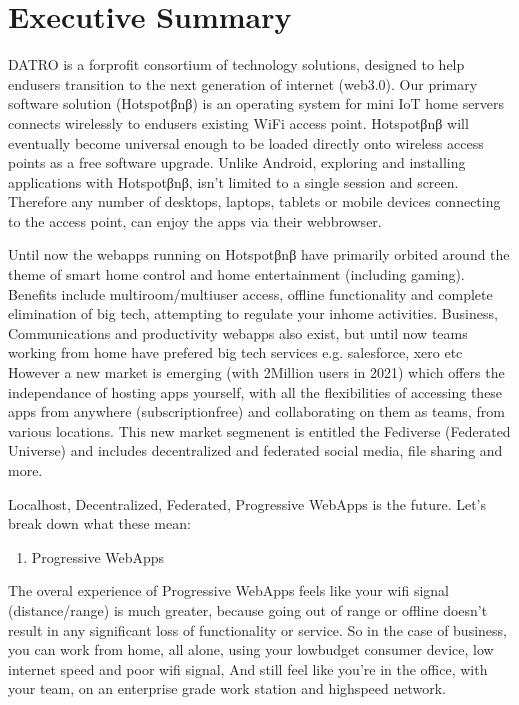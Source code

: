 \documentclass[letterpaper,10pt,openany,oneside,english]{sphinxmanual}
\begin{document}
\chapter{Executive Summary}
\label{\detokenize{executivesummary:executive-summary}}\label{\detokenize{executivesummary::doc}}
\sphinxAtStartPar
DATRO is a for\sphinxhyphen{}profit consortium of technology solutions, designed to help end\sphinxhyphen{}users transition to the next generation of internet (web3.0).
Our primary software solution (Hotspotβnβ) is an operating system for mini IoT home servers connects wirelessly to end\sphinxhyphen{}users existing Wi\sphinxhyphen{}Fi access point.
Hotspotβnβ will eventually become universal enough to be loaded directly onto wireless access points as a free software upgrade.
Unlike Android, exploring and installing applications with Hotspotβnβ, isn’t limited to a single session and screen.
Therefore any number of desktops, laptops, tablets or mobile devices connecting to the access point, can enjoy the apps via their web\sphinxhyphen{}browser.

\sphinxAtStartPar
Until now the webapps running on Hotspotβnβ have primarily orbited around the theme of smart home control and home entertainment (including gaming).
Benefits include multi\sphinxhyphen{}room/multi\sphinxhyphen{}user access, offline functionality and complete elimination of big tech, attempting to regulate your in\sphinxhyphen{}home activities.
Business, Communications and productivity webapps also exist, but until now teams working from home have prefered big tech services e.g. salesforce, xero etc
However a new market is emerging (with 2Million users in 2021) which offers the independance of hosting apps yourself,
with all the flexibilities of accessing these apps from anywhere (subscription\sphinxhyphen{}free) and collaborating on them as teams, from various locations.
This new market segmenent is entitled the Fediverse (Federated Universe) and includes decentralized and federated social media, file sharing and more.

\sphinxAtStartPar
Localhost, Decentralized, Federated, Progressive WebApps is the future. Let’s break down what these mean:
\begin{enumerate}
%
\item {} 
\sphinxAtStartPar
Progressive WebApps

\end{enumerate}

\sphinxAtStartPar
The overal experience of Progressive WebApps feels like your wi\sphinxhyphen{}fi signal (distance/range) is much greater, because going out of range or offline doesn’t result in any significant loss of functionality or service.
So in the case of business, you can work from home, all alone, using your low\sphinxhyphen{}budget consumer device, low internet speed and poor wi\sphinxhyphen{}fi signal,
And still feel like you’re in the office, with your team, on an enterprise grade work station and high\sphinxhyphen{}speed network.
\end{document}
